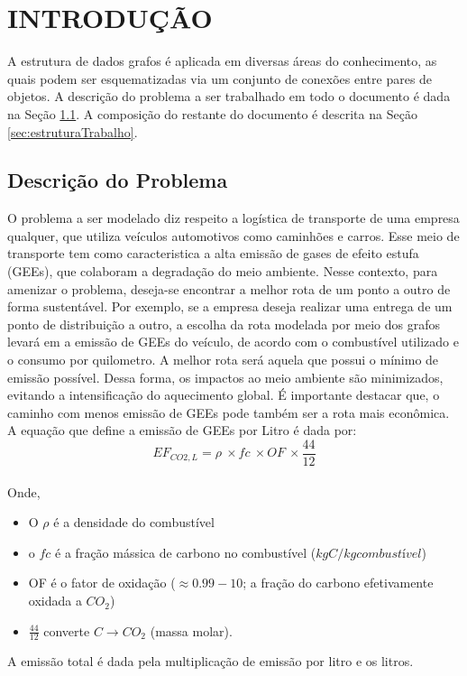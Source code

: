 \documentclass[
12pt,
a4paper,
semrecuonosumario,
sumario = abnt-6027-2012]{report}
\begin{document}
	
	\chapter{INTRODUÇÃO} \label{cap:introducao}
	
	A estrutura de dados grafos é aplicada em diversas áreas do conhecimento, as quais podem ser esquematizadas via um conjunto de conexões entre pares de objetos. A descrição do problema a ser trabalhado em todo o documento é dada na Seção \ref{sec:descGrafo}. A composição do restante do documento é descrita na Seção \ref{sec:estruturaTrabalho}.
	
	\section{Descrição do Problema}\label{sec:descGrafo}
	O problema a ser modelado diz respeito a logística de transporte de uma
	empresa qualquer, que utiliza veículos automotivos como caminhões e carros. Esse meio de transporte tem como caracteristica a alta emissão de gases de efeito estufa (GEEs), que colaboram a degradação do meio ambiente. Nesse
	contexto, para amenizar o problema, deseja-se encontrar a melhor rota de um
	ponto a outro de forma sustentável. Por exemplo, se a empresa deseja realizar
	uma entrega de um ponto de distribuição a outro, a escolha da rota modelada por
	meio dos grafos levará em a emissão de GEEs do veículo, de acordo com o combustível utilizado e o consumo por quilometro. A melhor rota
	será aquela que possui o mínimo de emissão possível. Dessa forma, os impactos ao meio ambiente são minimizados,
	evitando a intensificação do aquecimento global. É importante destacar que, o caminho com menos emissão de GEEs pode também ser a rota mais econômica. A equação que define a emissão de GEEs por Litro é dada por:
	\begin{equation}
		 EF_{CO2,L}=\rho\ \times fc\ \times OF\ \times\frac{44}{12} 
	\end{equation}
	\\
	Onde,
	\begin{itemize}
		\item O $\rho$ é  a densidade do combustível
		\item o $fc$ é a fração mássica de carbono no combustível ($kgC/kg combustível$)
		\item OF é o fator de oxidação ($\approx 0.99 - 10$; a fração do carbono efetivamente oxidada a $CO_2$)
		\item $\frac{44}{12}$  converte $C \rightarrow CO_2$ (massa molar). 
	\end{itemize}
	A emissão total é dada pela multiplicação de emissão por litro e os litros.
\end{document}
